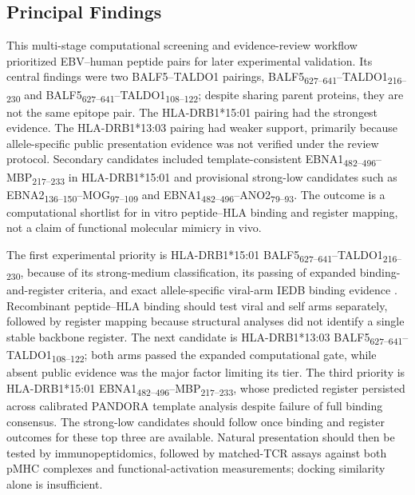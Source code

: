 \documentclass[11pt]{article}
\newcommand{\pep}[2]{#1\textsubscript{#2}}
\begin{document}
\subsection{Principal Findings}
This multi-stage computational screening and evidence-review workflow prioritized EBV--human peptide pairs for later experimental validation. Its central findings were two BALF5--TALDO1 pairings, \pep{BALF5}{627--641}--\pep{TALDO1}{216--230} and \pep{BALF5}{627--641}--\pep{TALDO1}{108--122}; despite sharing parent proteins, they are not the same epitope pair. The HLA-DRB1*15:01 pairing had the strongest evidence. The HLA-DRB1*13:03 pairing had weaker support, primarily because allele-specific public presentation evidence was not verified under the review protocol. Secondary candidates included template-consistent \pep{EBNA1}{482--496}--\pep{MBP}{217--233} in HLA-DRB1*15:01 and provisional strong-low candidates such as \pep{EBNA2}{136--150}--\pep{MOG}{97--109} and \pep{EBNA1}{482--496}--\pep{ANO2}{79--93}. The outcome is a computational shortlist for in vitro peptide--HLA binding and register mapping, not a claim of functional molecular mimicry in vivo.

The first experimental priority is HLA-DRB1*15:01 \pep{BALF5}{627--641}--\pep{TALDO1}{216--230}, because of its strong-medium classification, its passing of expanded binding-and-register criteria, and exact allele-specific viral-arm IEDB binding evidence \cite{iedb,hansen}. Recombinant peptide--HLA binding should test viral and self arms separately, followed by register mapping because structural analyses did not identify a single stable backbone register. The next candidate is HLA-DRB1*13:03 \pep{BALF5}{627--641}--\pep{TALDO1}{108--122}; both arms passed the expanded computational gate, while absent public evidence was the major factor limiting its tier. The third priority is HLA-DRB1*15:01 \pep{EBNA1}{482--496}--\pep{MBP}{217--233}, whose predicted register persisted across calibrated PANDORA template analysis despite failure of full binding consensus. The strong-low candidates should follow once binding and register outcomes for these top three are available. Natural presentation should then be tested by immunopeptidomics, followed by matched-TCR assays against both pMHC complexes and functional-activation measurements; docking similarity alone is insufficient.
\end{document}
